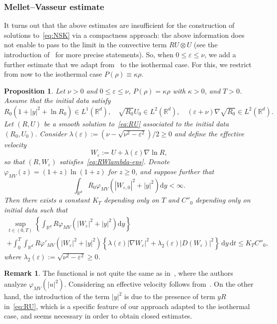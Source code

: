 \documentclass[11pt]{article}
\newtheorem{prop}[theo]{Proposition}
\theoremstyle{definition}
\newtheorem{rema}[theo]{Remark}
\numberwithin{equation}{section}
\numberwithin{figure}{section}
\numberwithin{table}{section}
\newcommand*\R{\mathbb{R}}
\newcommand*\dd {\mathrm{d}}
\newcommand*\<{\left\langle}
\renewcommand*\>{\right\rangle}
\renewcommand*\le{\leqslant}
\renewcommand*\ge{\geqslant}
\newcommand*\eps{\varepsilon}
\begin{document}
\subsubsection{Mellet--Vasseur estimate}\label{sec:mellet-vasseur}

It turns out that the above estimates are insufficient for the construction of solutions to~\eqref{eq:NSK} via a compactness approach: the above information does not enable to pass to the limit in the convective term $R U \otimes U$ (see the introduction of~\cite{VasseurYuInventiones} for more precise statements). So, when $0 \le \varepsilon \le \nu$, we add a further estimate that we adapt from~\cite{MelletVasseur,AS-comp} to the isothermal case. For this, we restrict from now to the isothermal case $P(\rho)\equiv \kappa \rho.$

\begin{prop}\label{prop:inegaliteMV}
Let $\nu >0$ and $0 \le \varepsilon \le \nu$, $P(\rho) = \kappa \rho$ with $\kappa >0$, and $T>0$. Assume that the initial data satisfy
\[
R_0(1+|y|^2 + \ln R_0) \in L^1 (\R^d), \quad
\sqrt{R_0} U_0 \in L^2(\R^d), \quad (\eps+\nu) \nabla \sqrt{R_0} \in L^2(\R^d).
\]
Let $(R,U)$ be a smooth solution to~\eqref{eq:RU} associated to the initial data $(R_0,U_0)$. Consider $\lambda(\eps) := (\nu - \sqrt{\nu^2 -
\eps^2})/2 \ge 0$ and define the effective velocity
\[
W_\eps := U + \lambda(\eps) \nabla \ln R,
\]
so that $(R,W_\eps)$ satisfies~\eqref{eq:RWlambda-eps}. Denote $\varphi_{MV}(z) = (1+z)\ln(1+z)$ for $z \ge 0$, and suppose further that
\[
\int_{\R^d} R_0 \varphi_{MV}\left(|W_{\eps,0}|^2 + |y|^2\right) \dd y < \infty.
\]
Then there exists a constant $K_T$ depending only on $T$ and $C''_0$ depending only on initial data such that
\begin{multline*}
\sup_{t \in (0,T)} \left\{ \int_{\R^d} R \varphi_{MV}\left(|W_\eps|^2 + |y|^2\right) \dd y\right\} \\
+ \int_{0}^T \int_{\R^d} R \varphi'_{MV}\left(|W_\eps|^2+ |y|^2\right) \left\{ \lambda(\eps) |\nabla W_\eps|^2 + \lambda_2(\eps)|D(W_\eps)|^2 \right\} \, \dd y \, \dd t
\le K_T C''_0,
\end{multline*}
where $\lambda_2(\eps) := \sqrt{\nu^2 - \eps^2} \ge 0$.
\end{prop}

\begin{rema}
The functional is not quite the same as in~\cite{MelletVasseur}, where the authors analyze $\varphi_{MV}(|u|^2)$. Considering an effective velocity follows from~\cite{AS-comp}. On the other hand, the introduction of the term $|y|^2$ is due to the presence of term $yR$ in~\eqref{eq:RU}, which is a specific feature of our approach adapted to the isothermal case, and seems necessary in order to obtain closed estimates.
\end{rema}
\end{document}
